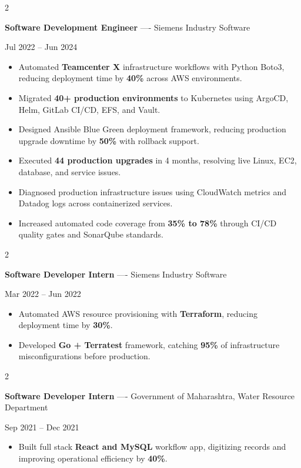 \documentclass[10pt, letterpaper]{article}
\newenvironment{highlights}{
    \begin{itemize}[
        topsep=0.10 cm,
        parsep=0.06 cm,
        partopsep=0pt,
        itemsep=0.06 cm,
        leftmargin=12pt
    ]
}{
    \end{itemize}
}
\newenvironment{twocolentry}[2][]{
    \onecolentry
    \def\secondColumn{#2}
    \setcolumnwidth{\fill, 4.5 cm}
    \begin{paracol}{2}
}{
    \switchcolumn \raggedleft \secondColumn
    \end{paracol}
    \endonecolentry
}
\begin{document}
\begin{twocolentry}{Jul 2022 -- Jun 2024}
\textbf{Software Development Engineer} ---- Siemens Industry Software
\end{twocolentry}
\begin{highlights}
  \item Automated \textbf{Teamcenter X} infrastructure workflows with Python Boto3, reducing deployment time by \textbf{40\%} across AWS environments.
  \item Migrated \textbf{40+ production environments} to Kubernetes using ArgoCD, Helm, GitLab CI/CD, EFS, and Vault.
  \item Designed Ansible Blue Green deployment framework, reducing production upgrade downtime by \textbf{50\%} with rollback support.
  \item Executed \textbf{44 production upgrades} in 4 months, resolving live Linux, EC2, database, and service issues.
  \item Diagnosed production infrastructure issues using CloudWatch metrics and Datadog logs across containerized services.
  \item Increased automated code coverage from \textbf{35\% to 78\%} through CI/CD quality gates and SonarQube standards.
\end{highlights}

\vspace{0.15 cm}

\begin{twocolentry}{Mar 2022 -- Jun 2022}
\textbf{Software Developer Intern} ---- Siemens Industry Software
\end{twocolentry}
\begin{highlights}
  \item Automated AWS resource provisioning with \textbf{Terraform}, reducing deployment time by \textbf{30\%}.
  \item Developed \textbf{Go + Terratest} framework, catching \textbf{95\%} of infrastructure misconfigurations before production.
\end{highlights}

\vspace{0.15 cm}

\begin{twocolentry}{Sep 2021 -- Dec 2021}
\textbf{Software Developer Intern} ---- Government of Maharashtra, Water Resource Department
\end{twocolentry}
\begin{highlights}
  \item Built full stack \textbf{React and MySQL} workflow app, digitizing records and improving operational efficiency by \textbf{40\%}.
\end{highlights}
\end{document}
